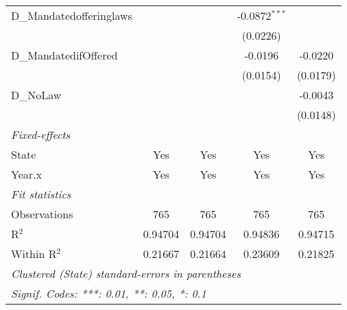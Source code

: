 \begin{table}[htbp]
\begin{tabular}{lcccc}
      D\_Mandatedofferinglaws        &                         &                         & -0.0872$^{***}$         &   \\   
                                     &                         &                         & (0.0226)                &   \\   
      D\_MandatedifOffered           &                         &                         & -0.0196                 & -0.0220\\   
                                     &                         &                         & (0.0154)                & (0.0179)\\   
      D\_NoLaw                       &                         &                         &                         & -0.0043\\   
                                     &                         &                         &                         & (0.0148)\\   
      \midrule
      \emph{Fixed-effects}\\
      State                          & Yes                     & Yes                     & Yes                     & Yes\\  
      Year.x                         & Yes                     & Yes                     & Yes                     & Yes\\  
      \midrule
      \emph{Fit statistics}\\
      Observations                   & 765                     & 765                     & 765                     & 765\\  
      R$^2$                          & 0.94704                 & 0.94704                 & 0.94836                 & 0.94715\\  
      Within R$^2$                   & 0.21667                 & 0.21664                 & 0.23609                 & 0.21825\\  
      \midrule \midrule
      \multicolumn{5}{l}{\emph{Clustered (State) standard-errors in parentheses}}\\
      \multicolumn{5}{l}{\emph{Signif. Codes: ***: 0.01, **: 0.05, *: 0.1}}\\
   \end{tabular}
\end{table}


